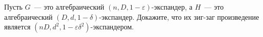 Пусть $G$~--- это алгебраический $(n, D, 1 - \varepsilon)$-экспандер, а $H$~--- это алгебраический
$(D, d, 1 - \delta)$-экспандер. Докажите, что их зиг-заг произведение является
$(nD, d^2, 1 - \varepsilon \delta^2)$-экспандером.
